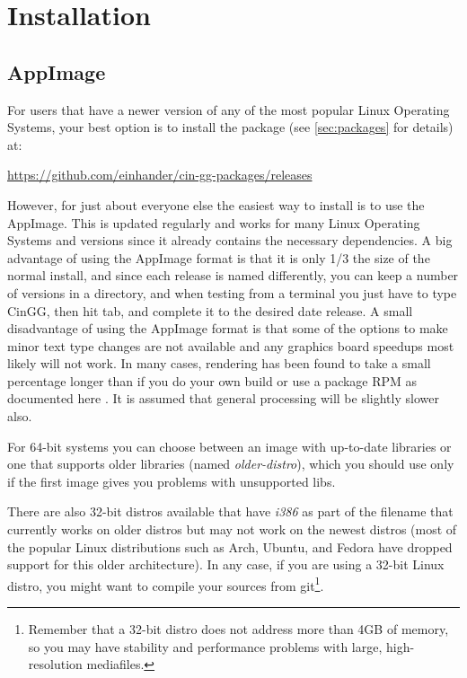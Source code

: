 \chapter{Installation}
\label{cha:Installation}

\section{\CGG{} AppImage}%
\label{sec:cin_gg_appimage}

For users that have a newer version of any of the most popular Linux Operating Systems,
your best option is to install the \CGG{} package (see \ref{sec:packages} for details) at:

  {\small \url{https://github.com/einhander/cin-gg-packages/releases}}

However, for just about everyone else the easiest way to install \CGG{} is to use the AppImage. This is updated regularly and works for many Linux Operating Systems and versions since it already contains the necessary dependencies. 
A big advantage of using the AppImage format is that it is only 1/3 the size of the normal install, and since each release is named differently, you can keep a number of versions in a directory, and when testing from a terminal you just have to type CinGG, then hit tab, and complete it to the desired date release.  A small disadvantage of using the AppImage format is that some of the options to make minor text type changes are not available and any graphics board speedups most likely will not work.  In many cases, rendering has been found to take a small percentage longer than if you do your own build or use a package RPM as documented here . It is assumed that general processing will be slightly slower also.

For 64-bit systems you can choose between an image with up-to-date libraries or one that supports older libraries (named \textit{older-distro}), which you should use only if the first image gives you problems with unsupported libs.  

There are also 32-bit distros available that have \textit{i386} as part of the filename that currently works on older distros but may not work on the newest distros
(most of the popular Linux distributions such as Arch, Ubuntu, and Fedora have dropped support for this older architecture). In any case, if you are using a 32-bit Linux distro, you might want to compile your sources from git\protect\footnote{Remember that a 32-bit distro does not address more than 4GB of memory, so you may have stability and performance problems with large, high-resolution mediafiles.}.

